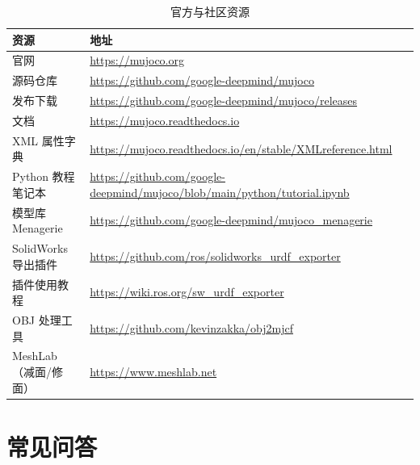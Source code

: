 \begin{table}[H]
	\centering
	\caption{官方与社区资源}
	\label{tab:App:资源}
	\footnotesize
	\begin{tabular}{>{\raggedright\arraybackslash}p{4.4cm}>{\raggedright\arraybackslash}p{9.8cm}}
		\hline
		资源 & 地址 \\
		\hline
		官网 & \url{https://mujoco.org} \\
		源码仓库 & \url{https://github.com/google-deepmind/mujoco} \\
		发布下载 & \url{https://github.com/google-deepmind/mujoco/releases} \\
		文档 & \url{https://mujoco.readthedocs.io} \\
		XML 属性字典 & \url{https://mujoco.readthedocs.io/en/stable/XMLreference.html} \\
		Python 教程笔记本 & \url{https://github.com/google-deepmind/mujoco/blob/main/python/tutorial.ipynb} \\
		模型库 Menagerie & \url{https://github.com/google-deepmind/mujoco_menagerie} \\
		SolidWorks 导出插件 & \url{https://github.com/ros/solidworks_urdf_exporter} \\
		插件使用教程 & \url{https://wiki.ros.org/sw_urdf_exporter} \\
		OBJ 处理工具 & \url{https://github.com/kevinzakka/obj2mjcf} \\
		MeshLab（减面/修面） & \url{https://www.meshlab.net} \\
		\hline
	\end{tabular}
\end{table}

\section{常见问答}

